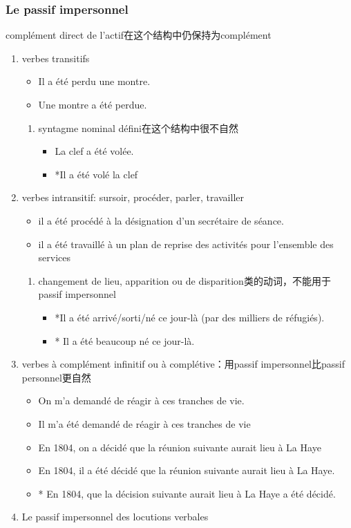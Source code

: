 \documentclass[UTF8]{report}
\begin{document}
\subsubsection{Le passif impersonnel}
complément direct de l’actif在这个结构中仍保持为complément
\begin{enumerate}
    \item verbes transitifs
    \begin{itemize}
        \item Il a été perdu une montre.
        \item Une montre a été perdue.
    \end{itemize}
    \begin{enumerate}
        \item syntagme nominal défini在这个结构中很不自然
        \begin{itemize}
            \item La clef a été volée.
            \item *Il a été volé la clef
        \end{itemize}
    \end{enumerate}
    \item verbes intransitif: sursoir, procéder, parler, travailler
    \begin{itemize}
        \item il a été procédé à la désignation d’un secrétaire de séance.
        \item il a été travaillé à un plan de reprise des activités pour l’ensemble des services
    \end{itemize}
    \begin{enumerate}
        \item changement de lieu, apparition ou de disparition类的动词，不能用于passif impersonnel
        \begin{itemize}
            \item *Il a été arrivé/sorti/né ce jour-là (par des milliers de réfugiés).
            \item * Il a été beaucoup né ce jour-là.
        \end{itemize}
    \end{enumerate}
    \item verbes à complément infinitif ou à complétive：用passif impersonnel比passif personnel更自然
    \begin{itemize}
        \item On m’a demandé de réagir à ces tranches de vie.
        \item Il m’a été demandé de réagir à ces tranches de vie
        \item En 1804, on a décidé que la réunion suivante aurait lieu à La Haye
        \item En 1804, il a été décidé que la réunion suivante aurait lieu à La Haye.
        \item * En 1804, que la décision suivante aurait lieu à La Haye a été décidé.
    \end{itemize}
    \item Le passif impersonnel des locutions verbales
    

\end{enumerate}
\end{document}
